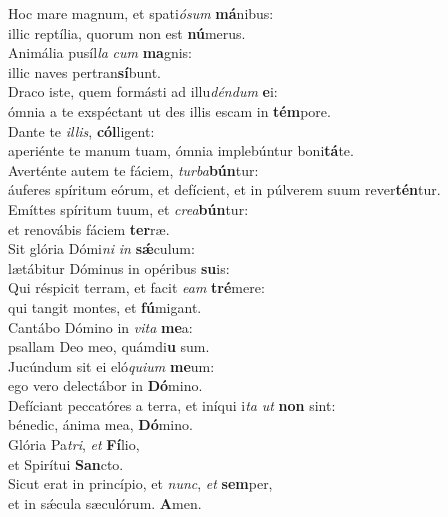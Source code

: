 \evenverse Hoc mare magnum, et spati\textit{ó}\textit{sum} \textbf{má}nibus:~\*\\
\evenverse illic reptília, quorum non est \textbf{nú}merus.\\
\oddverse Animália pusíl\textit{la} \textit{cum} \textbf{ma}gnis:~\*\\
\oddverse illic naves pertran\textbf{sí}bunt.\\
\evenverse Draco iste, quem formásti ad illu\textit{dén}\textit{dum} \textbf{e}i:~\*\\
\evenverse ómnia a te exspéctant ut des illis escam in \textbf{tém}pore.\\
\oddverse Dante te \textit{il}\textit{lis}, \textbf{cól}ligent:~\*\\
\oddverse aperiénte te manum tuam, ómnia implebúntur boni\textbf{tá}te.\\
\evenverse Averténte autem te fáciem, \textit{tur}\textit{ba}\textbf{bún}tur:~\*\\
\evenverse áuferes spíritum eórum, et defícient, et in púlverem suum rever\textbf{tén}tur.\\
\oddverse Emíttes spíritum tuum, et \textit{cre}\textit{a}\textbf{bún}tur:~\*\\
\oddverse et renovábis fáciem \textbf{ter}ræ.\\
\evenverse Sit glória Dómi\textit{ni} \textit{in} \textbf{sǽ}culum:~\*\\
\evenverse lætábitur Dóminus in opéribus \textbf{su}is:\\
\oddverse Qui réspicit terram, et facit \textit{e}\textit{am} \textbf{tré}mere:~\*\\
\oddverse qui tangit montes, et \textbf{fú}migant.\\
\evenverse Cantábo Dómino in \textit{vi}\textit{ta} \textbf{me}a:~\*\\
\evenverse psallam Deo meo, quámdi\textbf{u} sum.\\
\oddverse Jucúndum sit ei eló\textit{qui}\textit{um} \textbf{me}um:~\*\\
\oddverse ego vero delectábor in \textbf{Dó}mino.\\
\evenverse Defíciant peccatóres a terra, et iníqui i\textit{ta} \textit{ut} \textbf{non} sint:~\*\\
\evenverse bénedic, ánima mea, \textbf{Dó}mino.\\
\oddverse Glória Pa\textit{tri}, \textit{et} \textbf{Fí}lio,~\*\\
\oddverse et Spirítui \textbf{San}cto.\\
\evenverse Sicut erat in princípio, et \textit{nunc}, \textit{et} \textbf{sem}per,~\*\\
\evenverse et in sǽcula sæculórum. \textbf{A}men.\\
